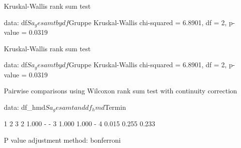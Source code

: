 
	Kruskal-Wallis rank sum test

data:  df$Sa_gesamt by df$Gruppe
Kruskal-Wallis chi-squared = 6.8901, df = 2, p-value = 0.0319


	Kruskal-Wallis rank sum test

data:  df$Sa_gesamt by df$Gruppe
Kruskal-Wallis chi-squared = 6.8901, df = 2, p-value = 0.0319


	Pairwise comparisons using Wilcoxon rank sum test with continuity correction 

data:  df_hmd$Sa_gesamt and df_hmd$Termin 

  1     2     3    
2 1.000 -     -    
3 1.000 1.000 -    
4 0.015 0.255 0.233

P value adjustment method: bonferroni 
